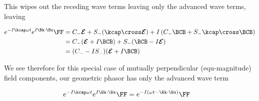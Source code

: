 This wipes out the receding wave terms leaving only the advanced wave terms, leaving

\begin{align*}
e^{ -I \kcap \omega t } e^{ I \Bk \cdot \Bx } \FF
&=
 C_{-} \EE 
+S_{-} (\kcap \cross \EE)
+{I}
\left( 
 C_{-} \BCB +S_{-} \kcap \cross \BCB 
\right) \\
&=
 C_{-} (\EE + I\BCB)
+S_{-} (\BCB -I\EE) \\
&=
( C_{-} -I S_{-} ) (\EE + I\BCB) \\
\end{align*}

We see therefore for this special case of mutually perpendicular (equ-magnitude) field components, our geometric phasor has only the advanced wave term

\begin{align}\label{eqn:fooG}
e^{ -I \kcap \omega t } e^{ I \Bk \cdot \Bx } \FF &= e^{-I(\omega t - \Bk \cdot \Bx)} \FF
\end{align}

\EndArticle
